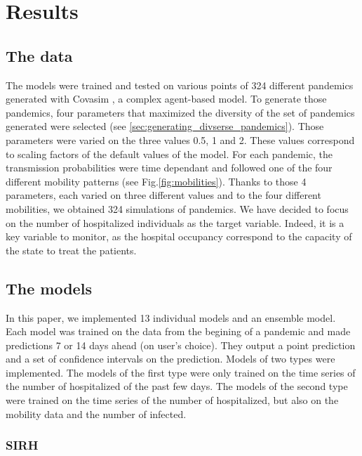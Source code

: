 \section*{Results}


\subsection{The data}

The models were trained and tested on various points of 324 different pandemics generated with Covasim \cite*{kerr2021covasim}, a complex agent-based model. 
To generate those pandemics, four parameters that maximized the diversity of the set of pandemics generated were selected (see \ref{sec:generating_divserse_pandemics}). 
Those parameters were varied on the three values 0.5, 1 and 2. 
These values correspond to scaling factors of the default values of the model. 
For each pandemic, the transmission probabilities were time dependant and followed one of the four different mobility patterns (see Fig.\ref{fig:mobilities}). 
Thanks to those 4 parameters, each varied on three different values and to the four different mobilities, we obtained 324 simulations of pandemics. 
We have decided to focus on the number of hospitalized individuals as the target variable. 
Indeed, it is a key variable to monitor, as the hospital occupancy correspond to the capacity of the state to treat the patients. 


\subsection*{The models}

In this paper, we implemented 13 individual models and an ensemble model.
Each model was trained on the data from the begining of a pandemic and made predictions 7 or 14 days ahead (on user's choice).
They output a point prediction and a set of confidence intervals on the prediction. 
Models of two types were implemented. 
The models of the first type were only trained on the time series of the number of hospitalized of the past few days. 
The models of the second type were trained on the time series of the number of hospitalized, but also on the mobility data and the number of infected. 

\subsubsection{SIRH}

